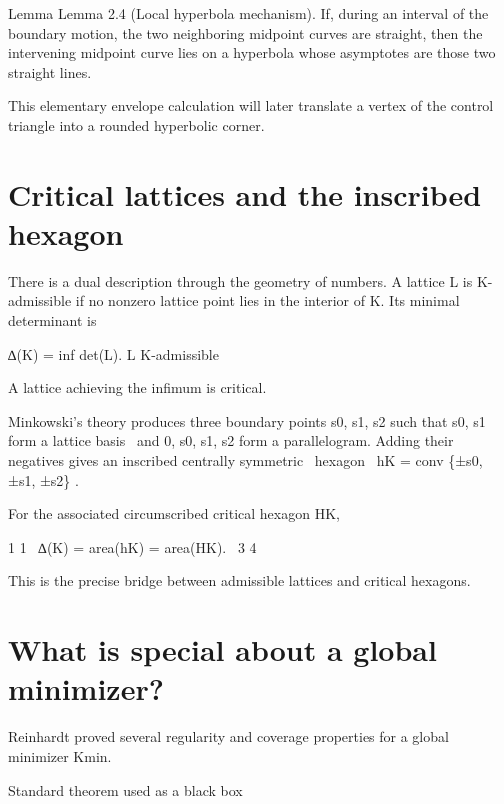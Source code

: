 \begin{statementbox}{Lemma}
Lemma 2.4 (Local hyperbola mechanism). If, during an interval of the boundary motion, the two neighboring midpoint curves are straight, then the intervening midpoint curve lies on a hyperbola whose asymptotes are those two straight lines.
\end{statementbox}

This elementary envelope calculation will later translate a vertex of the control triangle into a rounded hyperbolic corner.


\section{Critical lattices and the inscribed hexagon}

There is a dual description through the geometry of numbers. A lattice L is K-admissible if no nonzero lattice point lies in the interior of K. Its minimal determinant is


∆(K) = inf det(L). L K-admissible


A lattice achieving the infimum is critical.


\begin{displaytext}
Minkowski’s theory produces three boundary points s0, s1, s2 such that s0, s1 form a lattice basis \
and 0, s0, s1, s2 form a parallelogram. Adding their negatives gives an inscribed centrally symmetric \
hexagon \
hK = conv \{±s0, ±s1, ±s2\} .
\end{displaytext}

For the associated circumscribed critical hexagon HK,


\begin{displaytext}
1 1 \
∆(K) = area(hK) = area(HK). \
3 4
\end{displaytext}

This is the precise bridge between admissible lattices and critical hexagons.


\section{What is special about a global minimizer?}

Reinhardt proved several regularity and coverage properties for a global minimizer Kmin.


\begin{insightbox}{Standard theorem used as a black box}
\end{insightbox}

